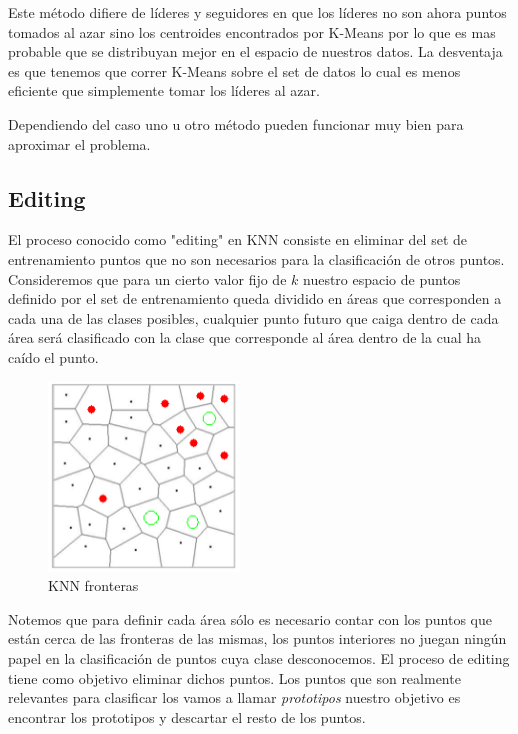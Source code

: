 Este método difiere de líderes y seguidores en que los líderes no son ahora puntos tomados al azar sino los centroides encontrados por K-Means por lo que es mas probable que se distribuyan mejor en el espacio de nuestros datos. La desventaja es que tenemos que correr K-Means sobre el set de datos lo cual es menos eficiente que simplemente tomar los líderes al azar. 

Dependiendo del caso uno u otro método pueden funcionar muy bien para aproximar el problema. 

\subsection{Editing}

El proceso conocido como "editing" en KNN consiste en eliminar del set de entrenamiento puntos que no son necesarios para la clasificación de otros puntos. Consideremos que para un cierto valor fijo de $k$ nuestro espacio de puntos definido por el set de entrenamiento queda dividido en áreas que corresponden a cada una de las clases posibles, cualquier punto futuro que caiga dentro de cada área será clasificado con la clase que corresponde al área dentro de la cual ha caído el punto.

\begin{figure}[!htb]
\centering
\includegraphics[width=2in]{figures/knn-voronoi-fig.png}
\caption{KNN fronteras}
\label{fig19}

\end{figure}

Notemos que para definir cada área sólo es necesario contar con los puntos que están cerca de las fronteras de las mismas, los puntos interiores no juegan ningún papel en la clasificación de puntos  cuya clase desconocemos. El proceso de editing tiene como objetivo eliminar dichos puntos. Los puntos que son realmente relevantes para clasificar los vamos a llamar \textit{prototipos} nuestro objetivo es encontrar los prototipos y descartar el resto de los puntos.

